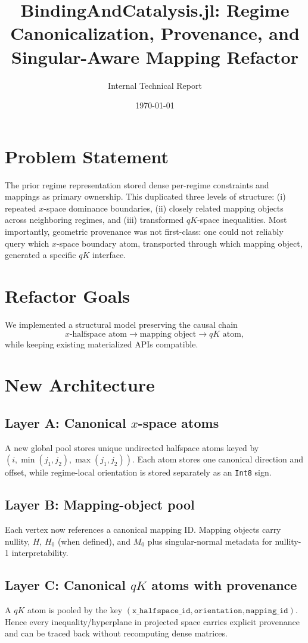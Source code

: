 \documentclass[11pt]{article}
\title{BindingAndCatalysis.jl: Regime Canonicalization, Provenance, and Singular-Aware Mapping Refactor}
\author{Internal Technical Report}
\date{\today}
\begin{document}
\maketitle

\section{Problem Statement}
The prior regime representation stored dense per-regime constraints and mappings as primary ownership. This duplicated three levels of structure: (i) repeated $x$-space dominance boundaries, (ii) closely related mapping objects across neighboring regimes, and (iii) transformed $qK$-space inequalities. Most importantly, geometric provenance was not first-class: one could not reliably query which $x$-space boundary atom, transported through which mapping object, generated a specific $qK$ interface.

\section{Refactor Goals}
We implemented a structural model preserving the causal chain
\[
\text{$x$-halfspace atom}\to\text{mapping object}\to\text{$qK$ atom},
\]
while keeping existing materialized APIs compatible.

\section{New Architecture}
\subsection{Layer A: Canonical $x$-space atoms}
A new global pool stores unique undirected halfspace atoms keyed by
\((i,\min(j_1,j_2),\max(j_1,j_2))\).
Each atom stores one canonical direction and offset, while regime-local orientation is stored separately as an \texttt{Int8} sign.

\subsection{Layer B: Mapping-object pool}
Each vertex now references a canonical mapping ID. Mapping objects carry nullity, $H$, $H_0$ (when defined), and $M_0$ plus singular-normal metadata for nullity-1 interpretability.

\subsection{Layer C: Canonical $qK$ atoms with provenance}
A $qK$ atom is pooled by the key
\((\texttt{x\_halfspace\_id},\texttt{orientation},\texttt{mapping\_id})\).
Hence every inequality/hyperplane in projected space carries explicit provenance and can be traced back without recomputing dense matrices.
\end{document}
